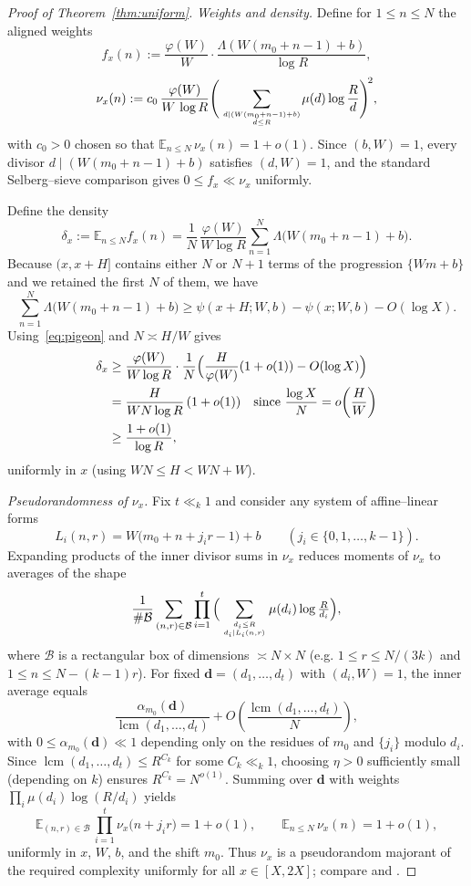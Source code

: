 \documentclass[11pt]{amsart}
\theoremstyle{definition}
\theoremstyle{remark}
\numberwithin{equation}{section}
\begin{document}
\begin{proof}[Proof of Theorem~\ref{thm:uniform}]
\smallskip
\noindent\emph{Weights and density.}
Define for $1\le n\le N$ the aligned weights
\[
f_x(n):=\frac{\varphi(W)}{W}\cdot\frac{\Lambda(W(m_0+n-1)+b)}{\log R},
\]
\[
\nu_x(n):=c_0\,\frac{\varphi(W)}{W\,\log R}\Bigg(\sum_{d\mid (W(m_0+n-1)+b)\atop d\le R}\!\mu(d)\log\frac{R}{d}\Bigg)^{\!2},
\]
with $c_0>0$ chosen so that $\mathbb{E}_{n\le N}\,\nu_x(n)=1+o(1)$. Since $(b,W)=1$, every divisor $d\mid (W(m_0+n-1)+b)$ satisfies $(d,W)=1$, and the standard Selberg–sieve comparison gives $0\le f_x\ll\nu_x$ uniformly.

Define the density
\[
\delta_x:=\mathbb{E}_{n\le N}f_x(n)=\frac{1}{N}\,\frac{\varphi(W)}{W\log R}\sum_{n=1}^{N}\Lambda\big(W(m_0+n-1)+b\big).
\]
Because $(x,x+H]$ contains either $N$ or $N+1$ terms of the progression $\{Wm+b\}$ and we retained the first $N$ of them, we have
\[
\sum_{n=1}^{N}\Lambda\big(W(m_0+n-1)+b\big)\ge \psi(x+H;W,b)-\psi(x;W,b)-O(\log X).
\]
Using~\eqref{eq:pigeon} and $N\asymp H/W$ gives
\begin{align}
\delta_x&\ge \frac{\varphi(W)}{W\log R}\cdot\frac{1}{N}\Big(\frac{H}{\varphi(W)}(1+o(1)) - O(\log X)\Big) \notag\\
&= \frac{H}{WN\log R}\,(1+o(1))\quad\text{since }\frac{\log X}{N}=o\!\left(\frac{H}{W}\right) \notag\\
&\ge \frac{1+o(1)}{\log R},\label{eq:density}
\end{align}
uniformly in $x$ (using $WN\le H<WN+W$).

\smallskip
\noindent\emph{Pseudorandomness of $\nu_x$.}
Fix $t\ll_k1$ and consider any system of affine–linear forms
\[
L_i(n,r)=W\big(m_0+n+j_i r-1\big)+b\qquad (j_i\in\{0,1,\dots,k-1\}).
\]
Expanding products of the inner divisor sums in $\nu_x$ reduces moments of $\nu_x$ to averages of the shape
\[
\frac{1}{\#\mathcal B}\sum_{(n,r)\in\mathcal B}\prod_{i=1}^{t}\Big(\sum_{d_i\le R\atop d_i\mid L_i(n,r)}\mu(d_i)\log\tfrac{R}{d_i}\Big),
\]
where $\mathcal B$ is a rectangular box of dimensions $\asymp N\times N$ (e.g. $1\le r\le N/(3k)$ and $1\le n\le N-(k-1)r$). For fixed $\mathbf d=(d_1,\dots,d_t)$ with $(d_i,W)=1$, the inner average equals
\[
\frac{\alpha_{m_0}(\mathbf d)}{\operatorname{lcm}(d_1,\dots,d_t)}+O\!\left(\frac{\operatorname{lcm}(d_1,\dots,d_t)}{N}\right),
\]
with $0\le\alpha_{m_0}(\mathbf d)\ll1$ depending only on the residues of $m_0$ and $\{j_i\}$ modulo $d_i$. Since $\operatorname{lcm}(d_1,\dots,d_t)\le R^{C_k}$ for some $C_k\ll_k1$, choosing $\eta>0$ sufficiently small (depending on $k$) ensures $R^{C_k}=N^{o(1)}$. Summing over $\mathbf d$ with weights $\prod_i\mu(d_i)\log(R/d_i)$ yields
\[
\mathbb E_{(n,r)\in\mathcal B}\,\prod_{i=1}^{t}\nu_x\big(n+j_i r\big)=1+o(1),\qquad \mathbb E_{n\le N}\,\nu_x(n)=1+o(1),
\]
uniformly in $x$, $W$, $b$, and the shift $m_0$. Thus $\nu_x$ is a pseudorandom majorant of the required complexity uniformly for all $x\in[X,2X]$; compare \cite[\S9]{GreenTao08} and \cite{CFZ13}.


\end{proof}
\end{document}
